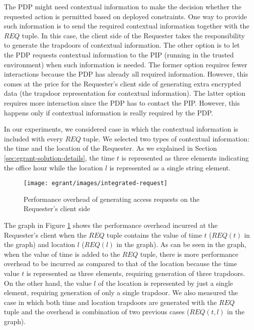 \documentclass[epsfig,a4paper,11pt,titlepage]{book}
\numberwithin{algorithm}{chapter}
\begin{document}
The \gls{PDP} might need contextual information to make the decision whether the requested action is permitted based on deployed constraints. One way to provide such information is to send the required contextual information together with the $\mathit{REQ}$ tuple. In this case, the client side of the Requester takes the responsibility to generate the trapdoors of contextual information. The other option is to let the \gls{PDP} requests contextual information to the \gls{PIP} (running in the trusted environment) when such information is needed. The former option requires fewer interactions because the \gls{PDP} has already all required information. However, this comes at the price for the Requester's client side of generating extra encrypted data (the trapdoor representation for contextual information). The latter option requires more interaction since the \gls{PDP} has to contact the \gls{PIP}. However, this happens only if contextual information is really required by the \gls{PDP}.

In our experiments, we considered case in which the contextual information is included with every $\mathit{REQ}$ tuple. We selected two types of contextual information: the time and the location of the Requester. As we explained in Section \ref{sec:egrant-solution-details}, the time $t$ is represented as three elements indicating the office hour while the location $l$ is represented as a single string element.

\begin{figure} [htp]
\centering
\texttt{[image: egrant/images/integrated-request]}
\caption[Performance overhead of generating access requests]{Performance overhead of generating access requests on the Requester's client side}
\label{fig:egrant-integrated-request}
\end{figure}

The graph in Figure \ref{fig:egrant-integrated-request} shows the performance overhead incurred at the Requester's client when the $\mathit{REQ}$ tuple contains the value of time $t$ ($\mathit{REQ}(t)$ in the graph) and location $l$ ($\mathit{REQ}(l)$ in the graph). As can be seen in the graph, when the value of time is added to the $\mathit{REQ}$ tuple, there is more performance overhead to be incurred as compared to that of the location because the time value $t$ is represented as three elements, requiring generation of three trapdoors. On the other hand, the value $l$ of the location is represented by just a single element, requiring generation of only a single trapdoor. We also measured the case in which both time and location trapdoors are generated with the $\mathit{REQ}$ tuple and the overhead is combination of two previous cases ($\mathit{REQ}(t,l)$ in the graph).
\end{document}
